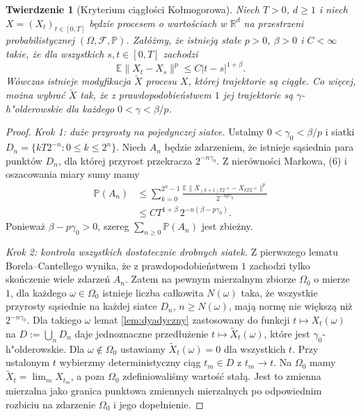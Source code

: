 \documentclass[11pt,a4paper,oneside]{report}
\numberwithin{equation}{chapter}
\theoremstyle{plain}
\newtheorem{twierdzenie}{Twierdzenie}[chapter]
\theoremstyle{definition}
\theoremstyle{remark}
\newcommand{\R}{\mathbb{R}}
\newcommand{\Prob}{\mathbb{P}}
\newcommand{\E}{\mathbb{E}}
\newcommand{\calF}{\mathcal{F}}
\newcommand{\norm}[1]{\lVert #1\rVert}
\newcommand{\abs}[1]{\lvert #1\rvert}
\begin{document}
\begin{twierdzenie}[Kryterium ciągłości Kołmogorowa]
\label{thm:kol-cont}
Niech $T>0$, $d\ge1$ i niech
$X=(X_t)_{t\in[0,T]}$ będzie procesem o wartościach w $\R^d$
na przestrzeni probabilistycznej $(\Omega,\calF,\Prob)$.
Załóżmy, że istnieją stałe $p>0$, $\beta>0$ i $C<\infty$
takie, że dla wszystkich $s,t\in[0,T]$ zachodzi
\[
\E\norm{X_t-X_s}^{p}\le C\abs{t-s}^{1+\beta}.
\tag{6}
\]
Wówczas istnieje modyfikacja $\widetilde X$ procesu $X$,
której trajektorie są ciągłe. Co więcej, można wybrać
$\widetilde X$ tak, że z prawdopodobieństwem $1$ jej
trajektorie są $\gamma$-h"olderowskie dla
\emph{każdego} $0<\gamma<\beta/p$.
\end{twierdzenie}
\begin{proof}
\emph{Krok 1: duże przyrosty na pojedynczej siatce.}
Ustalmy $0<\gamma_0<\beta/p$ i siatki
$D_n=\{kT2^{-n}:0\le k\le2^n\}$.
Niech $A_n$ będzie zdarzeniem, że istnieje sąsiednia
para punktów $D_n$, dla której przyrost przekracza
$2^{-n\gamma_0}$. Z nierówności Markowa, (6) i oszacowania
miary sumy mamy
\[
\begin{aligned}
\Prob(A_n)
&\le\sum_{k=0}^{2^n-1}
\frac{\E\norm{X_{(k+1)T2^{-n}}-X_{kT2^{-n}}}^{p}}
{2^{-np\gamma_0}}\\
&\le C T^{1+\beta}\,2^{-n(\beta-p\gamma_0)}.
\end{aligned}
\]
Ponieważ $\beta-p\gamma_0>0$, szereg
$\sum_{n\ge0}\Prob(A_n)$ jest zbieżny.

\emph{Krok 2: kontrola wszystkich dostatecznie drobnych siatek.}
Z pierwszego lematu Borela--Cantellego wynika, że z
prawdopodobieństwem $1$ zachodzi tylko skończenie wiele
zdarzeń $A_n$. Zatem na pewnym mierzalnym zbiorze
$\Omega_0$ o mierze $1$, dla każdego $\omega\in\Omega_0$
istnieje liczba całkowita $N(\omega)$ taka, że
wszystkie przyrosty sąsiednie na każdej siatce
$D_n$, $n\ge N(\omega)$, mają normę nie większą niż
$2^{-n\gamma_0}$. Dla takiego $\omega$ lemat
\ref{lem:dyadyczny} zastosowany do funkcji
$t\mapsto X_t(\omega)$ na $D:=\bigcup_nD_n$
daje jednoznaczne przedłużenie
$t\mapsto\widetilde X_t(\omega)$, które jest
$\gamma_0$-h"olderowskie.
Dla $\omega\notin\Omega_0$ ustawiamy
$\widetilde X_t(\omega)=0$ dla wszystkich $t$.
Przy ustalonym $t$ wybierzmy deterministyczny ciąg
$t_m\in D$ z $t_m\to t$. Na $\Omega_0$ mamy
$\widetilde X_t=\lim_m X_{t_m}$, a poza $\Omega_0$
zdefiniowaliśmy wartość stałą. Jest to zmienna mierzalna
jako granica punktowa zmiennych mierzalnych po
odpowiednim rozbiciu na zdarzenie $\Omega_0$ i jego dopełnienie.


\end{proof}
\end{document}

